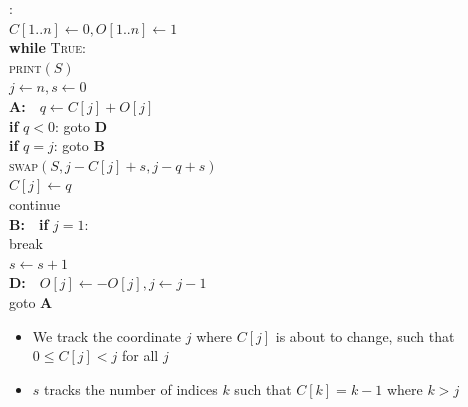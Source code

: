 \documentclass[aspectratio=169]{beamer}
\begin{document}
\begin{frame}{}
\begin{minipage}[c]{0.6\textwidth}
\begin{nalgo}
:
\\\label{}  {\color{lightgray}$C[1..n] \gets 0, O[1..n] \gets 1$}
\\\label{}  {\color{lightgray}\textbf{while} \textsc{True}:\+}
\\\label{}      {\color{lightgray}\textsc{print}$(S)$}
\\\label{}      $j \gets n, s \gets 0$
\\\label{}      {\color{lightgray}\textbf{A:}~~$q \gets C[j] + O[j]$\+}
\\\label{}          {\color{lightgray}\textbf{if} $q < 0$: goto \textbf{D}}
\\\label{}          {\color{lightgray}\textbf{if} $q = j$: goto \textbf{B}}
\\\label{}          {\color{lightgray}\textsc{swap}$(S, j-C[j]+s, j-q+s)$}
\\\label{}          {\color{lightgray}$C[j] \gets q$} 
\\\label{}          {\color{lightgray}continue\-}
\\\label{}      {\color{lightgray}\textbf{B:}~~\textbf{if} $j=1$:\+\+}
\\\label{}              {\color{lightgray}break\-}
\\\label{}          {\color{lightgray}$s \gets s+1$\-}
\\\label{}    {\color{lightgray}\textbf{D:}~~$O[j] \gets -O[j], j \gets j-1$\+}
\\\label{}      {\color{lightgray}goto \textbf{A}}
\end{nalgo}
\end{minipage}
\begin{minipage}[c]{0.35\textwidth}
\begin{itemize}
    \item We track the coordinate $j$ where $C[j]$ is about to change, such that $0\leq C[j] < j$ for all $j$ \pause
    \item $s$ tracks the number of indices $k$ such that $C[k] = k-1$ where $k > j$
\end{itemize}
\end{minipage}
\end{frame}
\end{document}
